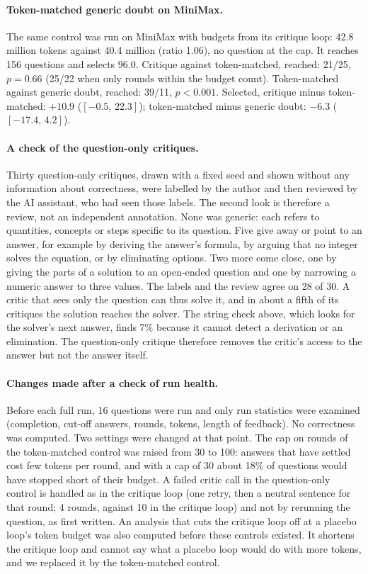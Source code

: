 \documentclass[11pt]{article}
\newcommand{\mm}{MiniMax}
\newcommand{\ci}[2]{$[#1,\,#2]$}
\begin{document}
\paragraph{Token-matched generic doubt on \mm.}
The same control was run on \mm{} with budgets from its critique loop: 42.8 million tokens against 40.4 million (ratio 1.06), no question at the cap.
It reaches 156 questions and selects 96.0.
Critique against token-matched, reached: 21/25, $p=0.66$ (25/22 when only rounds within the budget count).
Token-matched against generic doubt, reached: 39/11, $p<0.001$.
Selected, critique minus token-matched: $+10.9$ (\ci{-0.5}{22.3}); token-matched minus generic doubt: $-6.3$ (\ci{-17.4}{4.2}).

\paragraph{A check of the question-only critiques.}
Thirty question-only critiques, drawn with a fixed seed and shown without any information about correctness, were labelled by the author and then reviewed by the AI assistant, who had seen those labels. The second look is therefore a review, not an independent annotation. None was generic: each refers to quantities, concepts or steps specific to its question. Five give away or point to an answer, for example by deriving the answer's formula, by arguing that no integer solves the equation, or by eliminating options. Two more come close, one by giving the parts of a solution to an open-ended question and one by narrowing a numeric answer to three values. The labels and the review agree on 28 of 30. A critic that sees only the question can thus solve it, and in about a fifth of its critiques the solution reaches the solver. The string check above, which looks for the solver's next answer, finds 7\% because it cannot detect a derivation or an elimination. The question-only critique therefore removes the critic's access to the answer but not the answer itself.

\paragraph{Changes made after a check of run health.}
Before each full run, 16 questions were run and only run statistics were examined (completion, cut-off answers, rounds, tokens, length of feedback). No correctness was computed.
Two settings were changed at that point.
The cap on rounds of the token-matched control was raised from 30 to 100: answers that have settled cost few tokens per round, and with a cap of 30 about 18\% of questions would have stopped short of their budget.
A failed critic call in the question-only control is handled as in the critique loop (one retry, then a neutral sentence for that round; 4 rounds, against 10 in the critique loop) and not by rerunning the question, as first written.
An analysis that cuts the critique loop off at a placebo loop's token budget was also computed before these controls existed. It shortens the critique loop and cannot say what a placebo loop would do with more tokens, and we replaced it by the token-matched control.
\end{document}
